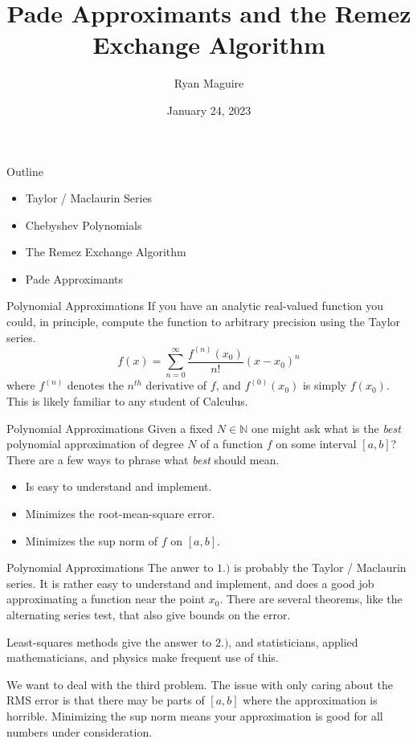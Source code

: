 \documentclass{beamer}
\title{Pade Approximants and the Remez Exchange Algorithm}
\author{Ryan Maguire}
\date{January 24, 2023}
\begin{document}
    \maketitle
    \begin{frame}{Outline}
        \begin{itemize}
            \item Taylor / Maclaurin Series
            \item Chebyshev Polynomials
            \item The Remez Exchange Algorithm
            \item Pade Approximants
        \end{itemize}
    \end{frame}
    \begin{frame}{Polynomial Approximations}
        If you have an analytic real-valued function you could, in principle,
        compute the function to arbitrary precision using the Taylor series.
        \begin{equation}
            f(x)=\sum_{n=0}^{\infty}\frac{f^{(n)}(x_{0})}{n!}(x-x_{0})^{n}
        \end{equation}
        where $f^{(n)}$ denotes the $n^{th}$ derivative of $f$, and
        $f^{(0)}(x_{0})$ is simply $f(x_{0})$. This is likely familiar to any
        student of Calculus.
    \end{frame}
    \begin{frame}{Polynomial Approximations}
        Given a fixed $N\in\mathbb{N}$ one might ask what is the
        \textit{best} polynomial approximation of degree $N$ of a function $f$
        on some interval $[a,b]$? There are a few ways to phrase what
        \textit{best} should mean.
        \begin{itemize}
            \item Is easy to understand and implement.
            \item Minimizes the root-mean-square error.
            \item Minimizes the sup norm of $f$ on $[a,b]$.
        \end{itemize}
    \end{frame}
    \begin{frame}{Polynomial Approximations}
        The anwer to $1.)$ is probably the Taylor / Maclaurin series.
        It is rather easy
        to understand and implement, and does a good job approximating a
        function near the point $x_{0}$. There are several theorems, like the
        alternating series test, that also give bounds on the error.
        \par\hfill\par
        Least-squares methods give the answer to $2.)$, and statisticians,
        applied mathematicians, and physics make frequent use of this.
        \par\hfill\par
        We want to deal with the third problem. The issue with only caring
        about the RMS error is that there may be parts of $[a,b]$ where
        the approximation is horrible. Minimizing the sup norm means your
        approximation is good for all numbers under consideration.
    \end{frame}
\end{document}
